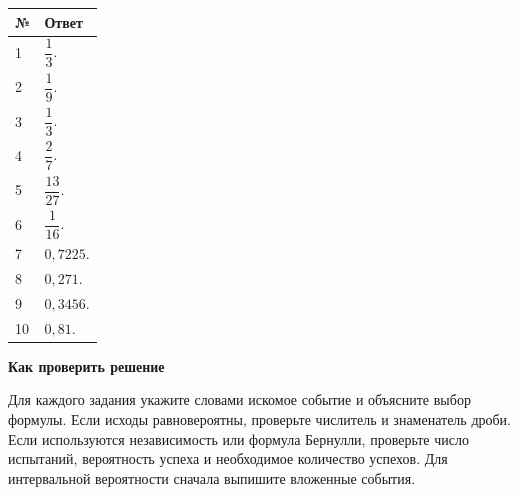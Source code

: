 \documentclass[a4paper,12pt]{article}
\begin{document}
\vspace{8mm}
\renewcommand{\arraystretch}{1.7}
\begin{tabularx}{\linewidth}{@{}p{1.5cm}X@{}}
\toprule
\textbf{№} & \textbf{Ответ}\\
\midrule
1 & $\dfrac13$.\\
2 & $\dfrac19$.\\
3 & $\dfrac13$.\\
4 & $\dfrac27$.\\
5 & $\dfrac{13}{27}$.\\
6 & $\dfrac1{16}$.\\
7 & $0{,}7225$.\\
8 & $0{,}271$.\\
9 & $0{,}3456$.\\
10 & $0{,}81$.\\
\bottomrule
\end{tabularx}
\vspace{12mm}
\textcolor{darkaccent}{\textbf{Как проверить решение}}\par
Для каждого задания укажите словами искомое событие и объясните выбор формулы. Если исходы равновероятны, проверьте числитель и знаменатель дроби. Если используются независимость или формула Бернулли, проверьте число испытаний, вероятность успеха и необходимое количество успехов. Для интервальной вероятности сначала выпишите вложенные события.
\end{document}

